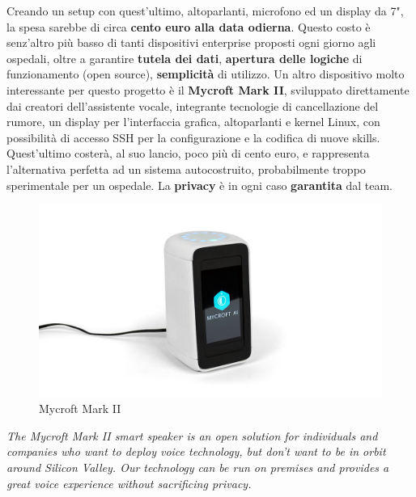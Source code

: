 Creando un setup con quest'ultimo, altoparlanti, microfono ed un display da 7", la spesa sarebbe di circa \textbf{cento euro alla data odierna}. Questo costo è senz'altro più basso di tanti dispositivi enterprise proposti ogni giorno agli ospedali, oltre a garantire \textbf{tutela dei dati}, \textbf{apertura delle logiche} di funzionamento (open source), \textbf{semplicità} di utilizzo. Un altro dispositivo molto interessante per questo progetto è il \textbf{Mycroft Mark II}, sviluppato direttamente dai creatori dell'assistente vocale, integrante tecnologie di cancellazione del rumore, un display per l'interfaccia grafica, altoparlanti e kernel Linux, con possibilità di accesso SSH per la configurazione e la codifica di nuove skills. Quest'ultimo costerà, al suo lancio, poco più di cento euro, e rappresenta l'alternativa perfetta ad un sistema autocostruito, probabilmente troppo sperimentale per un ospedale. La \textbf{privacy} è in ogni caso \textbf{garantita} dal team.
\begin{figure}[H]
    \begin{center}
        \includegraphics[width=0.8\columnwidth]{images/applicabilita/Mark_II.png}
    \end{center}
    \caption{Mycroft Mark II}
    \label{fig:mark-II}
\end{figure}
\begin{center}
    \textit{The Mycroft Mark II smart speaker is an open solution for individuals and companies who want to deploy voice technology, but don’t want to be in orbit around Silicon Valley.  Our technology can be run on premises and provides a great voice experience without sacrificing privacy.}
\end{center}
